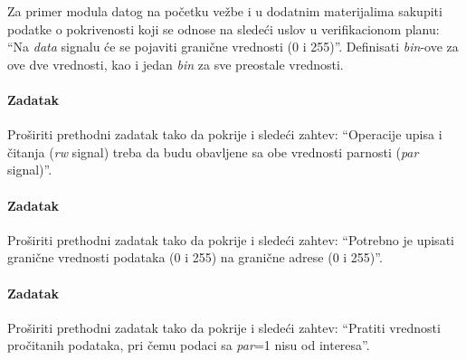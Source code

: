 Za primer modula datog na početku vežbe i u dodatnim materijalima sakupiti
podatke o pokrivenosti koji se odnose na sledeći uslov u verifikacionom planu:
``Na \emph{data} signalu će se pojaviti granične vrednosti (0 i 255)''.
Definisati \emph{bin}-ove za ove dve vrednosti, kao i jedan \emph{bin} za sve
preostale vrednosti.

\paragraph{Zadatak}

Proširiti prethodni zadatak tako da pokrije i sledeći zahtev: ``Operacije upisa
i čitanja (\emph{rw} signal) treba da budu obavljene sa obe vrednosti parnosti
(\emph{par} signal)''.

\paragraph{Zadatak}

Proširiti prethodni zadatak tako da pokrije i sledeći zahtev: ``Potrebno je
upisati granične vrednosti podataka (0 i 255) na granične adrese (0 i 255)''.

\paragraph{Zadatak}

Proširiti prethodni zadatak tako da pokrije i sledeći zahtev: ``Pratiti
vrednosti pročitanih podataka, pri čemu podaci sa \emph{par}=1 nisu od
interesa''.


